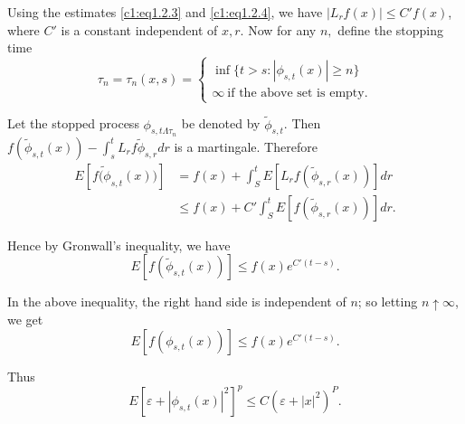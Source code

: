 Using the estimates \eqref{c1:eq1.2.3} and \eqref{c1:eq1.2.4}, 
we have $|L_r f(x)| \le
C'f(x)$, where $C'$ is a constant independent of $x,r$. Now for any
$n,$ define the stopping time 
\begin{equation*}
  \tau_n = \tau_n(x,s) =
  \begin{cases}
    \inf \{t > s: |\phi_{s,t}(x)| \ge n \} \\ 
    \infty ~\text{if the above set is empty}.
\end{cases}
\end{equation*}

Let the stopped process $\phi_{s,t \Lambda \tau_n}$ be denoted by
$\tilde{\phi}_{s,t}$. Then $f(\tilde{\phi}_{s,t}(x)) - \int^t_s L_r f
\tilde{\phi}_{s,r}dr$ is a martingale. Therefore 
\begin{align*}
  E [f \tilde{(\phi}_{s,t}(x))] & = f(x) + \int^t_S E[L_r f
    (\tilde{\phi}_{s,r}(x))] dr \\ 
  & \le f(x) + C' \int^t_S E[f (\tilde{\phi}_{s,r}(x))] dr.
\end{align*}\pageoriginale

Hence by Gronwall's inequality, we have
$$
E[f (\tilde{\phi}_{s,t}(x))] \le f(x) e^{C' (t-s)}.
$$

In the above inequality, the right hand side is independent of $n$; so
letting $n \uparrow \infty$, we get 
$$
E[f ({\phi}_{s,t}(x))] \le f(x) e^{C' (t-s)}.
$$

Thus 
$$
E[\varepsilon +| \phi_{s,t}(x) |^2 ]^p \le C(\varepsilon + |x|^2)^P.
$$

